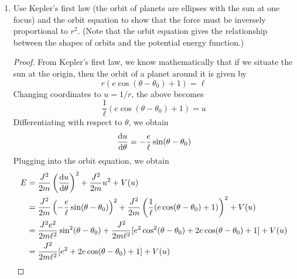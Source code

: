 \documentclass[../psets.tex]{subfiles}
\begin{document}
\begin{enumerate}
\begin{enumerate}
        \begin{proof}
            Mathematically, Kepler's second law tells us that $\dv*{A}{t}$ is constant. But since we know from \textcite[57]{bib:KibbleBerkshire} that $\dv*{A}{t}=J/2m$, we know that $J$ is constant. It follows that the net torque on the system is $\vec{r}\times\vec{F}=\vec{G}=\dot{\vec{J}}=0$. But this implies that if both $\vec{r}$ and $\vec{F}$ are nonzero, then they're parallel. This is equivalent to stating that the force is central, as desired.
        \end{proof}
        \item Use Kepler's first law (the orbit of planets are ellipses with the sun at one focus) and the orbit equation to show that the force must be inversely proportional to $r^2$. (Note that the orbit equation gives the relationship between the shapes of orbits and the potential energy function.)
        \begin{proof}
            From Kepler's first law, we know mathematically that if we situate the sun at the origin, then the orbit of a planet around it is given by
            \begin{equation*}
                r(e\cos(\theta-\theta_0)+1) = \ell
            \end{equation*}
            Changing coordinates to $u=1/r$, the above becomes
            \begin{equation*}
                \frac{1}{\ell}(e\cos(\theta-\theta_0)+1) = u
            \end{equation*}
            Differentiating with respect to $\theta$, we obtain
            \begin{equation*}
                \dv{u}{\theta} = -\frac{e}{\ell}\sin(\theta-\theta_0)
            \end{equation*}
            Plugging into the orbit equation, we obtain
            \begin{align*}
                E &= \frac{J^2}{2m}\left( \dv{u}{\theta} \right)^2+\frac{J^2}{2m}u^2+V(u)\\
                &= \frac{J^2}{2m}\left( -\frac{e}{\ell}\sin(\theta-\theta_0) \right)^2+\frac{J^2}{2m}\left( \frac{1}{\ell}(e\cos(\theta-\theta_0)+1) \right)^2+V(u)\\
                &= \frac{J^2e^2}{2m\ell^2}\sin^2(\theta-\theta_0)+\frac{J^2}{2m\ell^2}[e^2\cos^2(\theta-\theta_0)+2e\cos(\theta-\theta_0)+1]+V(u)\\
                &= \frac{J^2}{2m\ell^2}[e^2+2e\cos(\theta-\theta_0)+1]+V(u)\\

\end{align*}
\end{proof}
\end{enumerate}
\end{enumerate}
\end{document}
